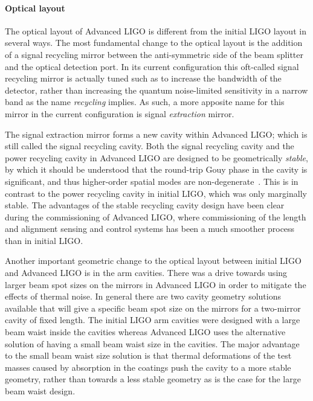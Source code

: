 \paragraph*{Optical layout}
The optical layout of Advanced LIGO is different from the initial LIGO layout in several ways. 
The most fundamental change to the optical layout is the addition of a signal recycling 
mirror between the anti-symmetric side of the beam splitter and the optical detection port. 
In its current configuration this oft-called signal recycling mirror is actually tuned such as to 
increase the bandwidth of the detector, rather than increasing the quantum noise-limited sensitivity
in a narrow band as the name \emph{recycling} implies. As such, a more apposite name for this mirror 
in the current configuration is signal \emph{extraction} mirror. 

The signal extraction mirror forms a new cavity within Advanced LIGO; which is still called the signal recycling cavity. 
Both the signal recycling cavity and the power recycling cavity in Advanced LIGO are designed to be 
geometrically \emph{stable}, by which it should be understood that the round-trip Gouy phase in the cavity 
is significant, and thus higher-order spatial modes are non-degenerate~\cite{Arain2008}. 
This is in contrast to the power recycling cavity in initial LIGO, which was only marginally stable. 
The advantages of the stable recycling cavity design have been clear during the commissioning of 
Advanced LIGO, where commissioning of the length and alignment sensing and control systems has 
been a much smoother process than in initial LIGO. 

Another important geometric change to the optical layout between initial LIGO and Advanced LIGO is 
in the arm cavities. There was a drive towards using larger beam spot sizes on the mirrors in Advanced 
LIGO in order to mitigate the effects of thermal noise. In general there are two cavity geometry solutions available 
that will give a specific beam spot size on the mirrors for a two-mirror cavity of fixed length. The initial LIGO 
arm cavities were designed with a large beam waist inside the cavities
whereas Advanced LIGO uses the alternative solution of having a small beam waist size in the cavities. 
The major advantage to the small beam waist size solution is that thermal deformations of the test masses caused by 
absorption in the coatings push the cavity to a more stable geometry, rather than towards a less stable geometry as 
is the case for the large beam waist design. 

